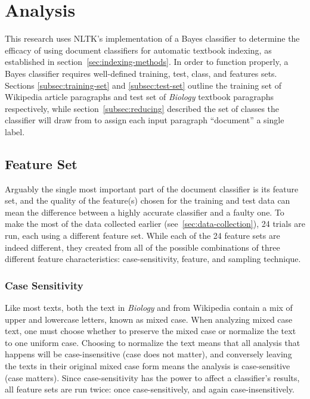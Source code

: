 \section{Analysis}

This research uses NLTK's implementation of a \naive Bayes classifier to determine the efficacy of using document classifiers for automatic textbook indexing, as established in section~\ref{sec:indexing-methods}.
In order to function properly, a \naive Bayes classifier requires well-defined training, test, class, and features sets.
Sections \ref{subsec:training-set} and \ref{subsec:test-set} outline the training set of Wikipedia article paragraphs and test set of {\it Biology} textbook paragraphs respectively, while section~\ref{subsec:reducing} described the set of classes the classifier will draw from to assign each input paragraph  ``document'' a single label.

\subsection{Feature Set}

Arguably the single most important part of the document classifier is its feature set, and the quality of the feature(s) chosen for the training and test data can mean the difference between a highly accurate classifier and a faulty one.
To make the most of the data collected earlier (see~\ref{sec:data-collection}), 24 trials are run, each using a different feature set.
While each of the 24 feature sets are indeed different, they created from all of the possible combinations of three different feature characteristics: case-sensitivity, feature, and sampling technique.

\subsubsection{Case Sensitivity}

Like most texts, both the text in {\it Biology} and from Wikipedia contain a mix of upper and lowercase letters, known as mixed case.
When analyzing mixed case text, one must choose whether to preserve the mixed case or normalize the text to one uniform case.
Choosing to normalize the text means that all analysis that happens will be case-insensitive (case does not matter), and conversely leaving the texts in their original mixed case form means the analysis is case-sensitive (case matters).
Since case-sensitivity has the power to affect a classifier's results, all feature sets are run twice: once case-sensitively, and again case-insensitively.

